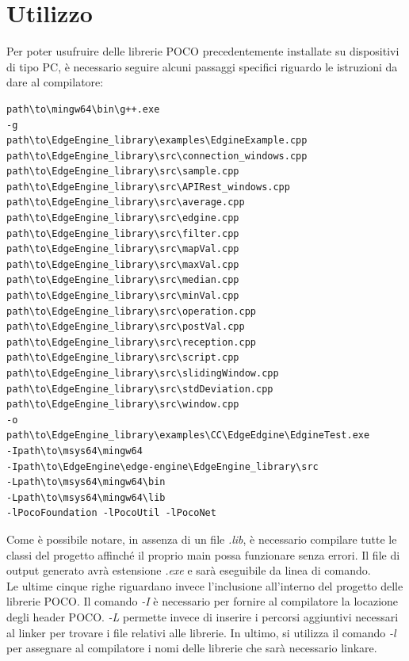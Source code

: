 \section{Utilizzo}\label{utilizzo}
Per poter usufruire delle librerie POCO precedentemente installate su dispositivi di tipo PC, è necessario seguire alcuni passaggi specifici riguardo le istruzioni da dare al compilatore:
\begin{verbatim}
path\to\mingw64\bin\g++.exe 
-g 
path\to\EdgeEngine_library\examples\EdgineExample.cpp
path\to\EdgeEngine_library\src\connection_windows.cpp
path\to\EdgeEngine_library\src\sample.cpp
path\to\EdgeEngine_library\src\APIRest_windows.cpp
path\to\EdgeEngine_library\src\average.cpp
path\to\EdgeEngine_library\src\edgine.cpp
path\to\EdgeEngine_library\src\filter.cpp
path\to\EdgeEngine_library\src\mapVal.cpp
path\to\EdgeEngine_library\src\maxVal.cpp
path\to\EdgeEngine_library\src\median.cpp
path\to\EdgeEngine_library\src\minVal.cpp
path\to\EdgeEngine_library\src\operation.cpp
path\to\EdgeEngine_library\src\postVal.cpp
path\to\EdgeEngine_library\src\reception.cpp
path\to\EdgeEngine_library\src\script.cpp
path\to\EdgeEngine_library\src\slidingWindow.cpp
path\to\EdgeEngine_library\src\stdDeviation.cpp
path\to\EdgeEngine_library\src\window.cpp
-o
path\to\EdgeEngine_library\examples\CC\EdgeEdgine\EdgineTest.exe
-Ipath\to\msys64\mingw64
-Ipath\to\EdgeEngine\edge-engine\EdgeEngine_library\src
-Lpath\to\msys64\mingw64\bin
-Lpath\to\msys64\mingw64\lib
-lPocoFoundation -lPocoUtil -lPocoNet
\end{verbatim}
Come è possibile notare, in assenza di un file \textit{.lib}, è necessario compilare tutte le classi del progetto affinché il proprio main possa funzionare senza errori. Il file di output generato avrà estensione \textit{.exe} e sarà eseguibile da linea di comando.\\
Le ultime cinque righe riguardano invece l'inclusione all'interno del progetto delle librerie POCO. Il comando \textit{-I} è necessario per fornire al compilatore la locazione degli header POCO. \textit{-L}  permette invece di inserire i percorsi aggiuntivi necessari al linker per trovare i file relativi alle librerie. In ultimo, si utilizza il comando \textit{-l} per assegnare al compilatore i nomi delle librerie che sarà necessario linkare.  
